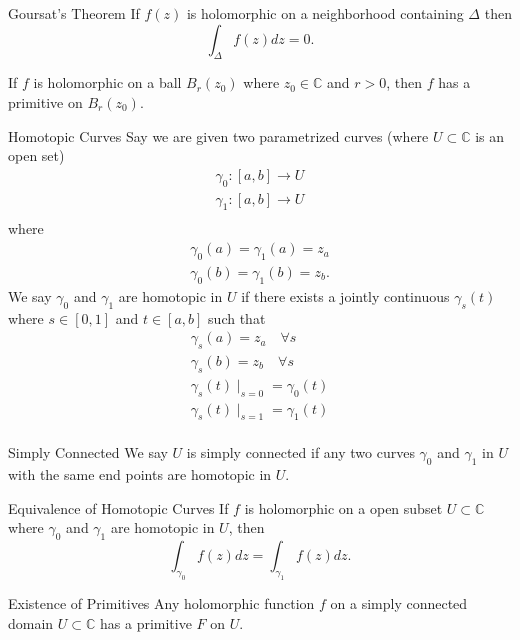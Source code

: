 \documentclass{article}
\begin{document}
\begin{thrm}{Goursat's Theorem}{}
If \( f(z) \) is holomorphic on a neighborhood containing \( \Delta   \) then 
\[
    \int _\Delta f(z) dz = 0.
\]
\end{thrm}






\begin{thrm}{}{}
If \( f \) is holomorphic on a ball \( B_r(z_0) \) where \( z_0 \in \mathbb{C}  \) and \( r>0 \), then \( f \) has a primitive on \( B_r(z_0) \).
\end{thrm}

\begin{defn}{Homotopic Curves}{}
Say we are given two parametrized curves (where \( U \subset \mathbb{C}  \) is an open set)
\begin{align*}
    \gamma _0: \left[ a,b \right] \to U \\
    \gamma _1: \left[ a,b \right] \to U \\
\end{align*}
 where 
\begin{align*}
    \gamma _0(a) = \gamma_1(a) = z_a \\
    \gamma _0(b) = \gamma _1(b) = z_b.
\end{align*}
We say \( \gamma _0  \) and \( \gamma _1 \) are homotopic in \( U \) if there exists a jointly continuous \( \gamma _s (t) \) where \( s \in [0, 1] \) and \( t \in \left[ a,b \right]  \) such that \begin{align*}
    \gamma _s(a) = z_a \quad \forall s\\
    \gamma _s(b) = z_b \quad \forall s\\
    \gamma _s (t) \mid _{s = 0} = \gamma _0(t) \\
    \gamma _s (t) \mid _{s = 1} = \gamma _1(t) \\
\end{align*}

\end{defn}
\begin{defn}{Simply Connected}{}
We say \( U \) is simply connected if any two curves \( \gamma _0 \) and \( \gamma _1 \) in \( U \) with the same end points are homotopic in \( U \). 
\end{defn}

\begin{thrm}{Equivalence of Homotopic Curves}{}
If \( f \) is holomorphic on a open subset \( U \subset \mathbb{C}  \) where \( \gamma _0 \) and \( \gamma _1 \) are homotopic in \( U \), then 
\[
    \int _{\gamma _0}f(z) dz = \int _{\gamma _1}f(z) dz.
\]
\end{thrm}

\begin{thrm}{Existence of Primitives}{}
Any holomorphic function \( f \) on a simply connected domain \( U \subset \mathbb{C}  \) has a primitive \( F \) on \( U \). 
\end{thrm}
\end{document}
